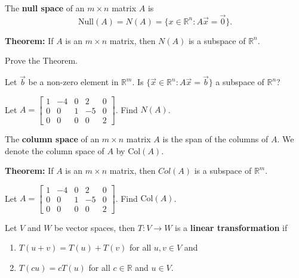 \newpage

\begin{defn}
	The {\bf null space} of an $m \times n$ matrix $A$ is $$\text{Null}(A)=N(A)=\{x \in \mathbb{R}^n : A\vec{x}=\vec{0}\}.$$
\end{defn}

{\bf Theorem:} If $A$ is an $m\times n$ matrix, then $N(A)$ is a subspace of $\mathbb{R}^n$.

\begin{enumerate}

\Problem Prove the Theorem.

\vfill

\Problem Let $\vec{b}$ be a non-zero element in $\mathbb{R}^m$. Is $\{ \vec{x} \in \mathbb{R}^n : A\vec{x}=\vec{b}\}$ a subspace of $\mathbb{R}^n$?

\vfill

\Problem Let $A=\begin{bmatrix} 1 & -4 & 0 & 2 &0\\  0 & 0 & 1 & -5 & 0\\ 0 & 0 & 0 & 0 & 2 \end{bmatrix}$. Find $N(A)$.



\vfill 

\newpage

\begin{defn}
	The {\bf column space} of an $m\times n$ matrix $A$ is the span of the columns of $A$. We denote the column space of $A$ by $\text{Col}(A)$.
\end{defn}

{\bf Theorem:} If $A$ is an $m\times n$ matrix, then $Col(A)$ is a subspace of $\mathbb{R}^m$.

\Problem Let $A=\begin{bmatrix} 1 & -4 & 0 & 2 &0\\  0 & 0 & 1 & -5 & 0\\ 0 & 0 & 0 & 0 & 2 \end{bmatrix}$. Find $\text{Col}(A)$.

\newpage

\begin{defn}
Let $V$ and $W$ be vector spaces, then $T: V \to W$ is a {\bf linear transformation} if 
\begin{enumerate}
	\item $T(u+v)=T(u)+T(v)$ for all $u, v \in V$ and 
	\item $T(c u)=c T(u)$ for all $c \in \mathbb{R}$ and $u \in V$.
\end{enumerate}
\end{defn}


\end{enumerate}
